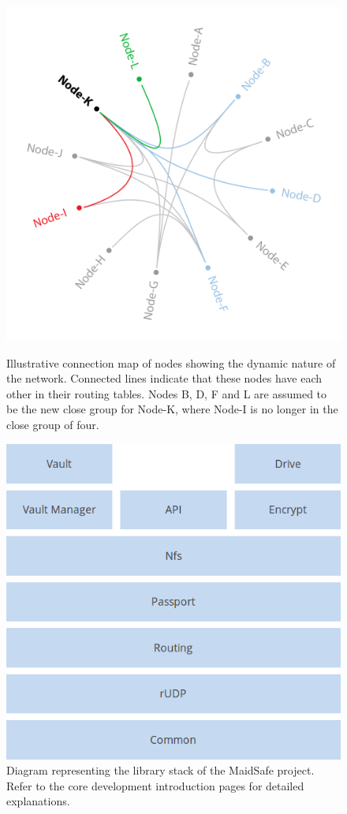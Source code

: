 \documentclass[twocolumn,english]{article}
\begin{document}
\begin{figure}[hbtp]
\centering
\includegraphics[scale=0.2]{connection-map.png}
\caption{Illustrative connection map of nodes showing the dynamic nature of the network. Connected lines indicate that these nodes have each other in their routing tables.  Nodes B, D, F and L are assumed to be the new close group for Node-K, where Node-I is no longer in the close group of four.}
\vspace{1cm}
\includegraphics[scale=0.35]{stack.png}
\caption{Diagram representing the library stack of the MaidSafe project. Refer to the core development introduction pages\cite{msCORE} for detailed explanations.}
\end{figure}
\end{document}
